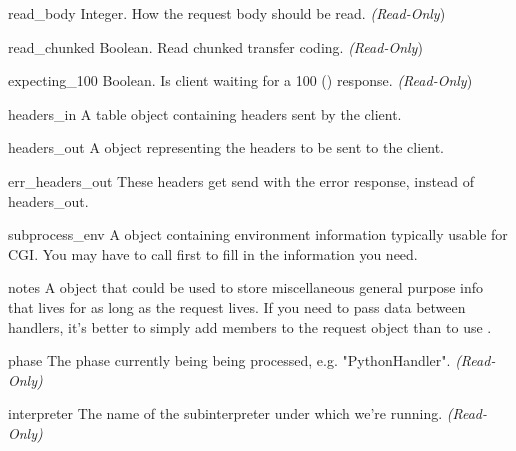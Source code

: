 \begin{memberdesc}[request]{read_body}
Integer. How the request body should be read.
\emph{(Read-Only})
\end{memberdesc}

\begin{memberdesc}[request]{read_chunked}
Boolean. Read chunked transfer coding.
\emph{(Read-Only})
\end{memberdesc}

\begin{memberdesc}[request]{expecting_100}
Boolean. Is client waiting for a 100 () response.
\emph{(Read-Only})
\end{memberdesc}

\begin{memberdesc}[request]{headers_in}
A table object containing headers sent by the client.
\end{memberdesc}

\begin{memberdesc}[request]{headers_out}
A  object representing the headers to be sent to the
client. 
\end{memberdesc}

\begin{memberdesc}[request]{err_headers_out}
These headers get send with the error response, instead of
headers_out.
\end{memberdesc}

\begin{memberdesc}[request]{subprocess_env}
A  object containing environment information typically usable for CGI.
You may have to call  first to fill in the information
you need.
\end{memberdesc}

\begin{memberdesc}[request]{notes}
A  object that could be used to store miscellaneous
general purpose info that lives for as long as the request lives. If
you need to pass data between handlers, it's better to simply add
members to the request object than to use .
\end{memberdesc}

\begin{memberdesc}[request]{phase}
The phase currently being being processed, e.g. "PythonHandler".
\emph{(Read-Only)}
\end{memberdesc}

\begin{memberdesc}[request]{interpreter}
The name of the subinterpreter under which we're running.
\emph{(Read-Only)}
\end{memberdesc}

